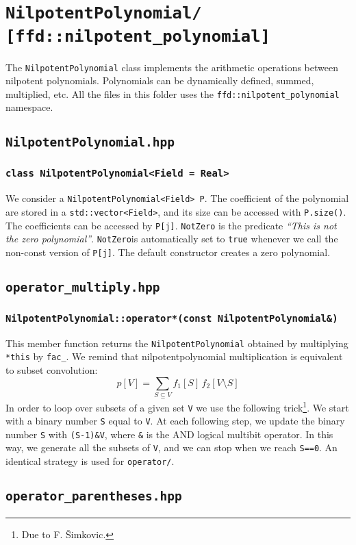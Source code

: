 \chapter{\texttt{NilpotentPolynomial/ [ffd::nilpotent\_polynomial]}}
The \texttt{NilpotentPolynomial} class implements the arithmetic operations between nilpotent polynomials. Polynomials can be dynamically defined, summed, multiplied, etc. All the files in this folder uses the \texttt{ffd::nilpotent\_polynomial} namespace.
\section{\texttt{NilpotentPolynomial.hpp}}
\subsection{\texttt{class NilpotentPolynomial<Field = Real>}}
We consider a \texttt{NilpotentPolynomial<Field> P}. The coefficient of the polynomial are stored in a \texttt{std::vector<Field>}, and its size can be accessed with \texttt{P.size()}. The coefficients can be accessed by \texttt{P[j]}. \texttt{NotZero} is the predicate {\it ``This is not the zero polynomial''}. \texttt{NotZero}is automatically set to \texttt{true} whenever we call the non-const version of \texttt{P[j]}. The default constructor creates a zero polynomial.
\section{\texttt{operator\_multiply.hpp}}
\subsection{\texttt{NilpotentPolynomial::operator*(const NilpotentPolynomial\&)}}
This member function returns the \texttt{NilpotentPolynomial} obtained by multiplying \texttt{*this} by \texttt{fac\_}. We remind that nilpotentpolynomial multiplication is equivalent to subset convolution:
$$
p[V] = \sum_{S\subseteq V} f_1[S]\,f_2[V\setminus S]
$$
In order to loop over subsets of a given set \texttt{V} we use the following trick\footnote{Due to F. \v{S}imkovic.}. We start with a binary number \texttt{S} equal to \texttt{V}. At each following step, we update the binary number \texttt{S} with \texttt{(S-1)\&V}, where \texttt{\&} is the AND logical multibit operator. In this way, we generate all the subsets of \texttt{V}, and we can stop when we reach \texttt{S==0}. An identical strategy is used for \texttt{operator/}.
\section{\texttt{operator\_parentheses.hpp}}
